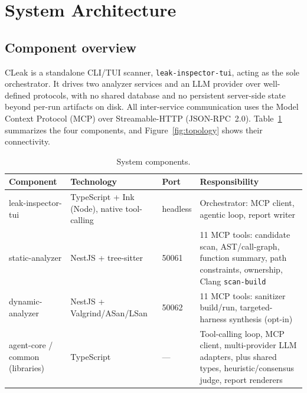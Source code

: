 \documentclass[11pt,a4paper]{article}
\begin{document}
\section{System Architecture}
\label{sec:arch}

\subsection{Component overview}

CLeak is a standalone CLI/TUI scanner, \texttt{leak-inspector-tui}, acting
as the sole orchestrator. It drives two analyzer services and an LLM
provider over well-defined protocols, with no shared database and no
persistent server-side state beyond per-run artifacts on disk. All
inter-service communication uses the Model Context Protocol (MCP) over
Streamable-HTTP (JSON-RPC~2.0). Table~\ref{tab:components} summarizes
the four components, and Figure~\ref{fig:topology} shows their connectivity.

\begin{table}[htbp]
\centering
\caption{System components.}
\label{tab:components}
\small
\begin{tabular}{@{}p{2.6cm}p{3.6cm}p{1.2cm}p{6.6cm}@{}}
\toprule
\textbf{Component} & \textbf{Technology} & \textbf{Port} & \textbf{Responsibility} \\
\midrule
leak-inspector-tui & TypeScript + Ink (Node), native tool-calling & headless & Orchestrator: MCP client, agentic loop, report writer \\
static-analyzer & NestJS + tree-sitter & 50061 & 11 MCP tools: candidate scan, AST/call-graph, function summary, path constraints, ownership, Clang \texttt{scan-build} \\
dynamic-analyzer & NestJS + Valgrind/ASan/LSan & 50062 & 11 MCP tools: sanitizer build/run, targeted-harness synthesis (opt-in) \\
agent-core / common (libraries) & TypeScript & --- & Tool-calling loop, MCP client, multi-provider LLM adapters, plus shared types, heuristic/consensus judge, report renderers \\
\bottomrule
\end{tabular}
\end{table}
\end{document}
